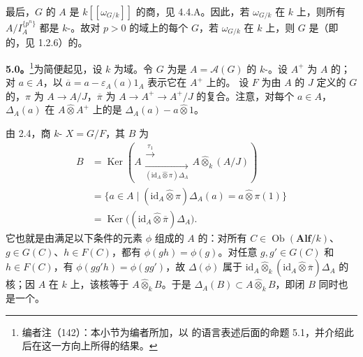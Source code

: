 最后，$G$ 的 $A$ 是 $k[[\omega_{G/k}]]$ 的商，见 4.4.A。因此，若 $\omega_{G/k}$ 在 $k$ 上，则所有 $A/I_A^{\{p^n\}}$ 都是 $k$-。故对 $p>0$ 的域上的每个 $G$，若 $\omega_{G/k}$ 在 $k$ 上，则 $G$ 是（即的，见 1.2.6）的。

\textbf{5.0。}\footnote{编者注（142）：本小节为编者所加，以 的语言表述后面的命题 5.1，并介绍此后在这一方向上所得的结果。}为简便起见，设 $k$ 为域。令 $G$ 为是 $A=\mathcal A(G)$ 的 $k$-。设 $A^+$ 为 $A$ 的；对 $a\in A$，以 $\overline a=a-\varepsilon_A(a)1_A$ 表示它在 $A^+$ 上的。
设 $F$ 为由 $A$ 的 $J$ 定义的 $G$ 的，$\pi$ 为 $A\to A/J$，$\overline\pi$ 为 $A\to A^+\to A^+/J$ 的复合。注意，对每个 $a\in A$，$\Delta_A(a)$ 在 $A\widehat\otimes A^+$ 上的是 $\Delta_A(a)-a\widehat\otimes1$。

由 2.4，商 $k$- $X=G/F$，其 $B$ 为
\[
\begin{aligned}
B&=\operatorname{Ker}\left(A\mathrel{\substack{\xrightarrow{\tau_1}\\[-2pt]\xrightarrow[(\mathrm{id}_A\widehat\otimes\pi)\Delta_A]{}}}A\widehat\otimes_k(A/J)\right)\\
&=\{a\in A\mid(\mathrm{id}_A\widehat\otimes\pi)\Delta_A(a)=a\widehat\otimes\pi(1)\}\\
&=\operatorname{Ker}\bigl((\mathrm{id}_A\widehat\otimes\overline\pi)\Delta_A\bigr).
\end{aligned}
\]
它也就是由满足以下条件的元素 $\phi$ 组成的 $A$ 的：对所有 $C\in\operatorname{Ob}(\mathbf{Alf}/k)$、$g\in G(C)$、$h\in F(C)$，都有 $\phi(gh)=\phi(g)$。对任意 $g,g'\in G(C)$ 和 $h\in F(C)$，有 $\phi(gg'h)=\phi(gg')$，故 $\Delta(\phi)$ 属于 $\mathrm{id}_A\widehat\otimes_k(\mathrm{id}_A\widehat\otimes\overline\pi)\Delta_A$ 的核；因 $A$ 在 $k$ 上，该核等于 $A\widehat\otimes_k B$。于是 $\Delta_A(B)\subset A\widehat\otimes_k B$，即闭 $B$ 同时也是一个。


